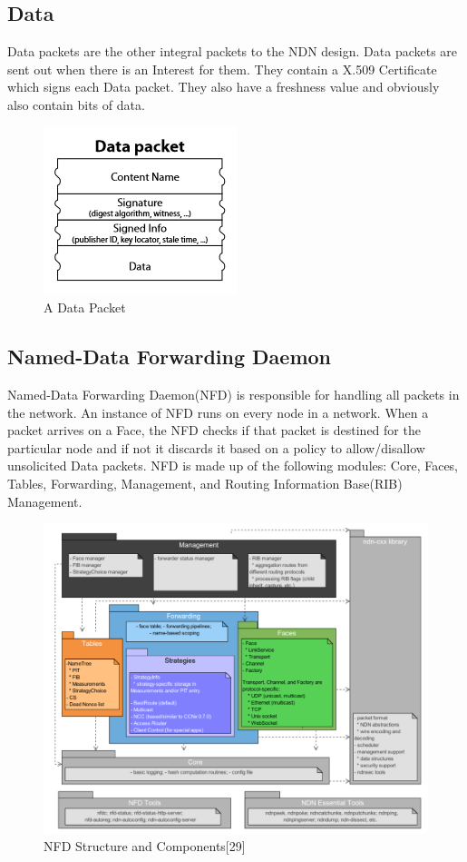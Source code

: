 \subsection{Data}
Data packets are the other integral packets to the NDN design. Data packets are sent out when there is an Interest for them. They contain a X.509 Certificate which signs each Data packet. They also have a freshness value and obviously also contain bits of data.
\begin{figure}[h]
\centering
\includegraphics{datapacket.png}
\caption{A Data Packet\cite{028}}
\end{figure}
\subsection{Named-Data Forwarding Daemon}
Named-Data Forwarding Daemon(NFD) is responsible for handling all packets in the network. An instance of NFD runs on every node in a network. When a packet arrives on a Face, the NFD checks if that packet is destined for the particular node and if not it discards it based on a policy to allow/disallow unsolicited Data packets.
NFD is made up of the following modules: Core, Faces, Tables, Forwarding, Management, and Routing Information Base(RIB) Management.
\begin{figure}[ht]
\centering
\includegraphics[scale=0.5]{nfd.png}
\caption{NFD Structure and Components[29]}
\end{figure}

